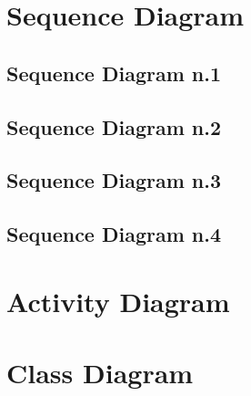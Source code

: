 \documentclass[a4paper,titlepage]{book}
\begin{document}
\section{Sequence Diagram}
\subsection{Sequence Diagram n.1}
\subsection{Sequence Diagram n.2}
\subsection{Sequence Diagram n.3}
\subsection{Sequence Diagram n.4}
\section{Activity Diagram}
\section{Class Diagram}

\newpage
\thispagestyle{empty}




\nocite{ingsft}
\nocite{ingreq}
\nocite{inglab}
\end{document}
